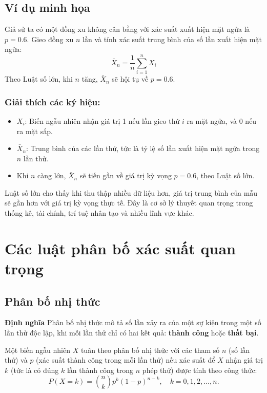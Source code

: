 \subsection{Ví dụ minh họa}
Giả sử ta có một đồng xu không cân bằng với xác suất xuất hiện mặt ngửa là $p = 0.6$. Gieo đồng xu $n$ lần và tính xác suất trung bình của số lần xuất hiện mặt ngửa:
\begin{equation}
\bar{X}_n = \frac{1}{n} \sum_{i=1}^{n} X_i
\end{equation}
Theo Luật số lớn, khi $n$ tăng, $\bar{X}_n$ sẽ hội tụ về $p = 0.6$.

\subsubsection*{Giải thích các ký hiệu:}
\begin{itemize}
    \item $X_i$: Biến ngẫu nhiên nhận giá trị 1 nếu lần gieo thứ $i$ ra mặt ngửa, và 0 nếu ra mặt sấp.
    \item $\bar{X}_n$: Trung bình của các lần thử, tức là tỷ lệ số lần xuất hiện mặt ngửa trong $n$ lần thử.
    \item Khi $n$ càng lớn, $\bar{X}_n$ sẽ tiến gần về giá trị kỳ vọng $p = 0.6$, theo Luật số lớn.
\end{itemize}


Luật số lớn cho thấy khi thu thập nhiều dữ liệu hơn, giá trị trung bình của mẫu sẽ gần hơn với giá trị kỳ vọng thực tế. Đây là cơ sở lý thuyết quan trọng trong thống kê, tài chính, trí tuệ nhân tạo và nhiều lĩnh vực khác.





\section{Các luật phân bố xác suất quan trọng}
\subsection{Phân bố nhị thức}
\textbf{Định nghĩa}
Phân bố nhị thức mô tả số lần xảy ra của một sự kiện trong một số lần thử độc lập, khi mỗi lần thử chỉ có hai kết quả: \textbf{thành công} hoặc \textbf{thất bại}.

Một biến ngẫu nhiên $X$ tuân theo phân bố nhị thức với các tham số $n$ (số lần thử) và $p$ (xác suất thành công trong mỗi lần thử) nếu xác suất để $X$ nhận giá trị $k$ (tức là có đúng $k$ lần thành công trong $n$ phép thử) được tính theo công thức:
\begin{equation}
    P(X = k) = \binom{n}{k} p^k (1-p)^{n-k}, \quad k = 0,1,2,\dots,n.
\end{equation}

